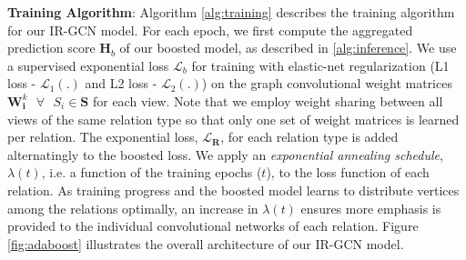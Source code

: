 \noindent
\textbf{Training Algorithm}: Algorithm \ref{alg:training} describes the training algorithm for our IR-GCN model. For each epoch, we first compute the aggregated prediction score $\mathbf{H}_{b}$ of our boosted model, as described in \cref{alg:inference}. We use a supervised exponential loss $\mathcal{L}_b$ for training with elastic-net regularization (L1 loss - $\mathcal L_1(.)$ and L2 loss - $\mathcal L_2(.) $) on the graph convolutional weight matrices $\mathbf{W}_{\mathbf{i}}^{k} \texttt{  }\forall\texttt{ } S_i \in \mathbf{S}$ for each view. Note that we employ weight sharing between all views of the same relation type so that only one set of weight matrices is learned per relation. %
The exponential loss, $\mathcal{L}_{\mathbf{R}}$, for each relation type is added alternatingly to the boosted loss.
We apply an \emph{exponential annealing schedule}, $\lambda(t)$, i.e. a function of the training epochs ($t$), to the loss function of each relation. As training progress and the boosted model learns to distribute vertices among the relations optimally, an increase in $\lambda(t)$ ensures more emphasis is provided to the individual convolutional networks of each relation. Figure \ref{fig:adaboost} illustrates the overall architecture of our IR-GCN model.








